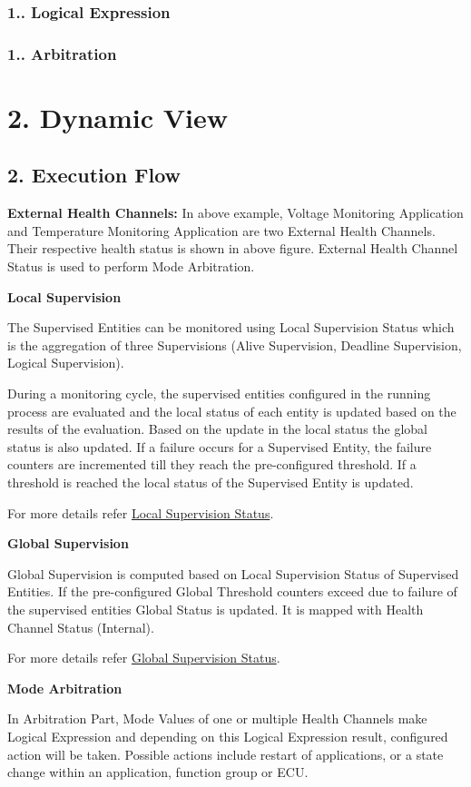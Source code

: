  \subsubsection*{1.. Logical Expression}

 \subsubsection*{1.. Arbitration}

 \section*{2. Dynamic View}

\subsection*{2. Execution Flow}


\begin{DoxyItemize}
\item {\bfseries External Health Channels\+:} In above example, Voltage Monitoring Application and Temperature Monitoring Application are two External Health Channels. Their respective health status is shown in above figure. External Health Channel Status is used to perform Mode Arbitration.
\item {\bfseries Local Supervision}

The Supervised Entities can be monitored using Local Supervision Status which is the aggregation of three Supervisions (Alive Supervision, Deadline Supervision, Logical Supervision).

During a monitoring cycle, the supervised entities configured in the running process are evaluated and the local status of each entity is updated based on the results of the evaluation. Based on the update in the local status the global status is also updated. If a failure occurs for a Supervised Entity, the failure counters are incremented till they reach the pre-\/configured threshold. If a threshold is reached the local status of the Supervised Entity is updated.

For more details refer \hyperlink{_appendix_Local_Supervision_Status}{Local Supervision Status}.
\item {\bfseries Global Supervision}

Global Supervision is computed based on Local Supervision Status of Supervised Entities. If the pre-\/configured Global Threshold counters exceed due to failure of the supervised entities Global Status is updated. It is mapped with Health Channel Status (Internal).

For more details refer \hyperlink{_appendix_Global_Supervision_Status}{Global Supervision Status}.
\item {\bfseries Mode Arbitration}

In Arbitration Part, Mode Values of one or multiple Health Channels make Logical Expression and depending on this Logical Expression result, configured action will be taken. Possible actions include restart of applications, or a state change within an application, function group or E\+CU.
\end{DoxyItemize}


